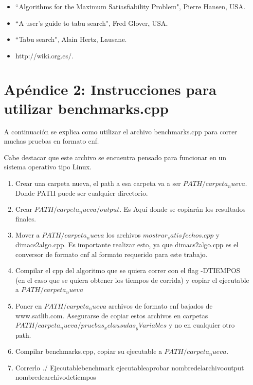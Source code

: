 \documentclass[a4paper,10pt]{article}
\begin{document}
\begin{itemize}
\item ``Algorithms for the Maximum Satiasfiability Problem", Pierre Hansen, USA. 
\item  ``A user's guide to tabu search", Fred Glover, USA.
\item ``Tabu search", Alain Hertz, Lausane.
\item http://wiki.org.es/.
\end{itemize}

\newpage
\section*{Ap\'endice 2: Instrucciones para utilizar benchmarks.cpp}
A continuaci\'on se explica como utilizar el archivo benchmarks.cpp para correr muchas pruebas en formato cnf.

Cabe destacar que este archivo se encuentra pensado para funcionar en un sistema operativo tipo Linux.

\begin{enumerate}
\item Crear una carpeta nueva, el path a esa carpeta va a ser $PATH/carpeta_nueva$. Donde PATH puede ser cualquier directorio.
\item Crear $PATH/carpeta_nueva/output$. Es Aqu\'i donde se copiar\'an los resultados finales.
\item Mover a $PATH/carpeta_nueva$ los archivos $mostrar_satisfechos.cpp$ y dimacs2algo.cpp. Es importante realizar esto, ya que dimacs2algo.cpp es el conversor de formato cnf al formato requerido para este trabajo.
\item Compilar el cpp del algoritmo que se quiera correr con el flag -DTIEMPOS (en el caso que se quiera obtener los tiempos de corrida) y copiar el ejecutable a $PATH/carpeta_nueva$
\item Poner en $PATH/carpeta_nueva$ archivos de formato cnf bajados de www.satlib.com. Asegurarse de copiar estos archivos en carpetas $PATH/carpeta_nueva/pruebas_xclausulas_yVariables$ y no en cualquier otro path.
\item Compilar benchmarks.cpp, copiar su ejecutable a $PATH/carpeta_nueva$.
\item Correrlo ./ Ejecutablebenchmark  ejecutableaprobar nombredelarchivooutput nombredearchivodetiempos
\end{enumerate}
\end{document}
